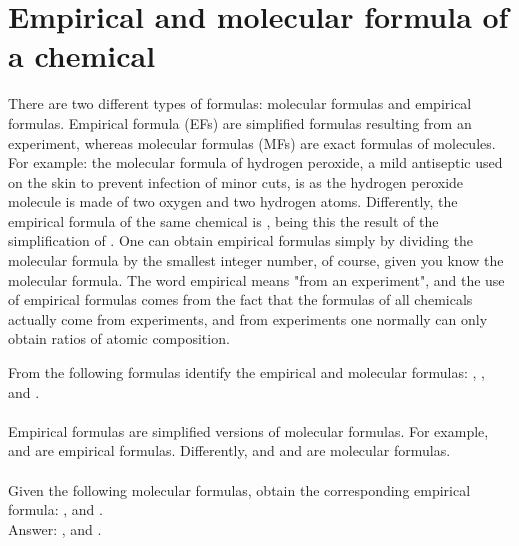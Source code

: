 \documentclass[main.tex]{subfiles}
\begin{document}
\section{Empirical and molecular formula of a chemical}
There are two different types of formulas: molecular formulas and empirical formulas. Empirical formula (EFs) are simplified formulas resulting from an experiment, whereas molecular formulas (MFs) are exact formulas of molecules. For example: the molecular formula of hydrogen peroxide, a mild antiseptic used on the skin to prevent infection of minor cuts, is  as the hydrogen peroxide molecule is made of two oxygen and two hydrogen atoms. Differently, the empirical formula of the same chemical is , being this the result of the simplification of . One can obtain empirical formulas simply by dividing the molecular formula by the smallest integer number, of course, given you know the molecular formula. The word empirical means "from an experiment", and the use of empirical formulas comes from the fact that the formulas of all chemicals actually come from experiments, and from experiments one normally can only obtain ratios of atomic composition. 

\begin{example} %
From the following formulas identify the empirical and molecular formulas: , ,  and .\\
\\
Empirical formulas are simplified versions of molecular formulas. For example,  and  are empirical formulas. Differently,  and and  are molecular formulas.
\\
\faDiamond\ \\
Given the following molecular formulas, obtain the corresponding empirical formula: ,  and .\\
\flushright Answer: ,  and .
\end{example}%
\end{document}
